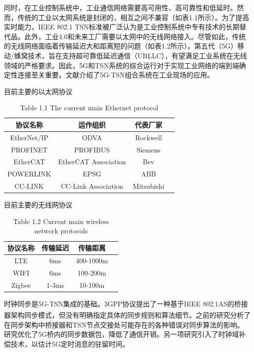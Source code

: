 \documentclass[UTF8,a4paper,12pt]{ctexart}
\numberwithin{equation}{section}
\begin{document}
	同时，在工业控制系统中，工业通信网络需要高可用性、高可靠性和低延时。然而，传统的工业以太网系统是封闭的，相互之间不兼容（如表1.1所示）。为了提高实时能力，IEEE 802.1 TSN标准被广泛认为是工业控制系统中专有技术的长期替代品。此外，工业4.0和未来工厂需要以太网中的无线网络接入。尽管如此，传统的无线网络面临着传输延迟大和距离短的问题（如表1.2所示）。第五代（5G）移动/蜂窝技术，旨在支持超可靠低延迟通信（URLLC），有望满足工业系统在无线领域的严格要求。因此，5G和TSN系统的综合运行对于实现工业网络的端到端确定性连接至关重要。文献\cite{zhang2022wireless}介绍了5G-TSN组合系统在工业现场的应用。
	\begin{table}[!htbp]
		\centering
		\caption{目前主要的以太网协议}
		\vspace{-10pt}
		\caption*{Table 1.1 The current main Ethernet protocol}
		
		\begin{tabular}{|c| c|c|c|}
			\hline
			\textbf{协议名称}& \textbf{运作组织}& \textbf{代表厂家} \\
			\hline
			EtherNet/IP
			& ODVA
			& Rockwell \\
			\hline
			PROFINET
			& PROFIBUS
			& Siemens \\
			\hline
			EtherCAT
			& EtherCAT Association
			& Bev \\
			\hline
			POWERLINK
			& EPSG
			& ABB \\
			\hline
			CC-LINK
			& CC-Link Association
			& Mitsubishi \\
			\hline
		\end{tabular}
	\end{table}
	\begin{table}[!htbp]
		\centering
		\caption{目前主要的无线网协议}
		\vspace{-10pt}
		\caption*{Table 1.2 Current main wireless network protocols}
		\begin{tabular}{|c| c|c|c|}
			\hline
			\textbf{协议名称}& \textbf{传输延迟}& \textbf{传输距离} \\
			\hline
			LTE
			& 6ms
			& 400-1000m \\
			\hline
			WIFI
			& 6ms
			& 100-200m \\
			\hline
			Zigbee
			& 1-3ms
			& 10-100m \\
			\hline
		\end{tabular}
	\end{table}
	时钟同步是5G-TSN集成的基础。3GPP协议提出了一种基于IEEE 802.1AS的桥接器架构同步模式，但没有明确指定具体的同步规则和算法细节\textsuperscript{\cite{888888}}。之前的研究\cite{9527833}分析了在同步架构中桥接器和TSN节点交接处可能存在的各种错误对同步算法的影响。研究\cite{9211936}优化了5G桥内的同步数据包，降低了通信开销。另一项研究\cite{9674640}引入了时钟域补偿技术，以估计5G定时消息的驻留时间。
	
\end{document}
